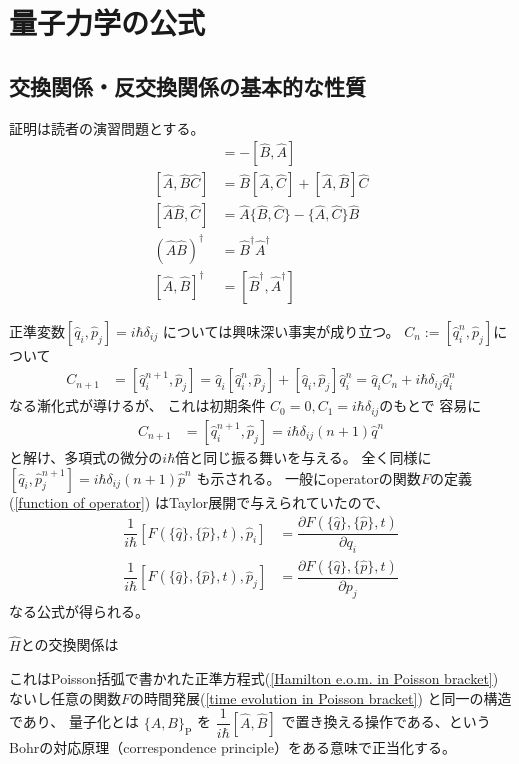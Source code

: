 \appendix
\renewcommand{\theequation}{A.\arabic{section}.\arabic{equation}}
\setcounter{equation}{0}

\section{量子力学の公式}

\subsection{交換関係・反交換関係の基本的な性質}

証明は読者の演習問題とする。
\begin{align}
    [\hat{A}, \hat{B}] &= - [\hat{B}, \hat{A}]
\\
    [\hat{A}, \hat{B}\hat{C}]
   &=
   \hat{B}[\hat{A}, \hat{C}]
+
    [\hat{A}, \hat{B}] \hat{C}
\label{A,BC to B(A,C) + (A,B)C}
\\
    [\hat{A}\hat{B}, \hat{C}]
   &=
   \hat{A}\{\hat{B}, \hat{C}\}
-
    \{\hat{A}, \hat{C}\} \hat{B}
\\
    \left(\hat{A}\hat{B}\right)^\dagger
    &=
    \hat{B}^\dagger\hat{A}^\dagger
\\
    [\hat{A}, \hat{B}]^\dagger
    &=
    [\hat{B}^\dagger, \hat{A}^\dagger]
\end{align}

正準変数$[\hat{q}_i, \hat{p}_j] = i\hbar\delta_{ij}$
については興味深い事実が成り立つ。
$C_n := [\hat{q}^n_i, \hat{p}_j]$について
\begin{align}
    C_{n+1}
    &=
    [\hat{q}^{n+1}_i, \hat{p}_j]
    =
    \hat{q}_i [\hat{q}_i^n, \hat{p}_j]
    +
    [\hat{q}_i, \hat{p}_j] \hat{q}_i^n
    =
    \hat{q}_i C_n
    +
    i\hbar\delta_{ij} \hat{q}_i^n
\end{align}
なる漸化式が導けるが、
これは初期条件
$C_0  = 0, C_1 = i\hbar\delta_{ij}$のもとで
容易に
\begin{align}
    C_{n+1} &= [\hat{q}^{n+1}_i, \hat{p}_j]
    = i\hbar\delta_{ij} (n+1) \hat{q}^n
\end{align}
と解け、多項式の微分の$i\hbar$倍と同じ振る舞いを与える。
全く同様に
$[\hat{q}_i, \hat{p}^{n+1}_j]
= i\hbar\delta_{ij} (n+1) \hat{p}^n$
も示される。
一般にoperatorの関数$F$の定義
(\ref{function of operator})
はTaylor展開で与えられていたので、
\begin{align}
    \dfrac{1}{i\hbar}
    [F(\{ \hat{q} \},\{ \hat{p} \}, t), \hat{p}_i]
    &=
    \dfrac{
        \partial F(\{ \hat{q} \},\{ \hat{p} \}, t)
    }{
        \partial q_i
    }
\\
    \dfrac{1}{i\hbar}
    [F(\{ \hat{q} \},\{ \hat{p} \}, t), \hat{p}_j]
    &=
    \dfrac{
        \partial F(\{ \hat{q} \},\{ \hat{p} \}, t)
    }{
        \partial p_j
    }
\end{align}
なる公式が得られる。

$\hat{H}$との交換関係は

これはPoisson括弧で書かれた正準方程式(\ref{Hamilton e.o.m. in Poisson bracket})
ないし任意の関数$F$の時間発展(\ref{time evolution in Poisson bracket})
と同一の構造であり、
量子化とは
$\{A, B\}_{ \mathrm{P} }$
を
$\dfrac{1}{i\hbar} [\hat{A}, \hat{B}]$
で置き換える操作である、という
Bohrの対応原理（correspondence principle）をある意味で正当化する。
